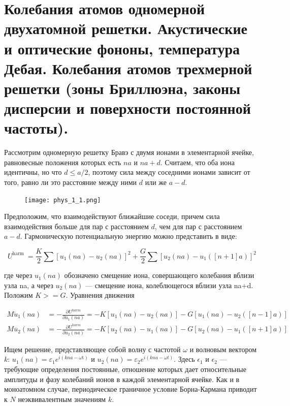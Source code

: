\section{Колебания атомов одномерной двухатомной решетки. Акустические и оптические фононы, температура Дебая. Колебания атомов трехмерной 
решетки (зоны Бриллюэна, законы дисперсии и поверхности постоянной частоты).}

Рассмотрим одномерную решетку Бравэ с двумя ионами в элементарной ячейке, равновесные положения которых есть $na$ и $na+d$. Считаем, что оба иона идентичны, но что $d \leq a/2$, поэтому сила между соседними ионами зависит от того, равно ли это расстояние между ними $d$ или же $a-d$. 

\begin{figure}[h!]
    \texttt{[image: phys\_1\_1.png]}
\end{figure}

Предположим, что взаимодействуют ближайшие соседи, причем сила взаимодействия больше для пар с расстоянием $d$, чем для пар с расстоянием $a-d$. Гармоническую потенциальную энергию можно представить в виде:

\begin{equation}
    U^{\text {harm }}=\frac{K}{2} \sum\left[u_1(n a)-u_2(n a)\right]^2+\frac{G}{2} \sum\left[u_2(n a)-u_1([n+1] a)\right]^2
\end{equation}

\noindent где через $u_1(na)$ обозначено смещение иона, совершающего колебания вблизи узла na, а через $u_2(na)$ --- смещение иона, колеблющегося вблизи узла na+d. Положим $K>=G$. Уравнения движения 

\begin{equation}
    \begin{aligned}
    M \ddot{u}_1(n a) & =-\frac{\partial U^{h a r m}}{\partial u_1(n a)}=-K\left[u_1(n a)-u_2(n a)\right]-G\left[u_1(n a)-u_2([n-1] a)\right] \\
    M \ddot{u_2}(n a) & =-\frac{\partial U^{h a r m}}{\partial u_2(n a)}=-K\left[u_2(n a)-u_1(n a)\right]-G\left[u_2(n a)-u_1([n+1] a)\right]
    \end{aligned}
\end{equation}


Ищем решение, представляющее собой волну с частотой $\omega$ и волновым вектором $k$: $u_1(n a)=\varepsilon_1 e^{i(k n a-\omega \mathrm{t})}$ и $u_2(n a)=\varepsilon_2 e^{i(k n a-\omega t)}$. Здесь $\epsilon_1$ и $\epsilon_2$ --- требующие определения постоянные, отношение которых дает относительные амплитуды и фазу колебаний ионов в каждой элементарной ячейке. Как и в моноатомном случае, периодическое граничное условие Борна-Кармана приводит к $N$ неэквивалентным значениям $k$. 

